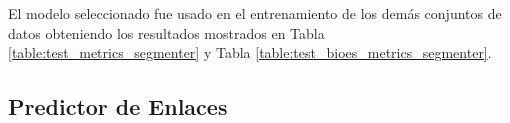 El modelo seleccionado fue usado en el entrenamiento de los demás conjuntos de datos obteniendo los resultados mostrados
en Tabla \ref{table:test_metrics_segmenter} y Tabla \ref{table:test_bioes_metrics_segmenter}.

\begin{table}[h!]
	\begin{center}
	\caption{Métricas de las pruebas del segmentador de UDA.}\label{table:test_metrics_segmenter}
	\end{center}
\end{table}
\begin{table}[h!]
	\begin{center}
	\caption{Métricas BIOES de las pruebas del segmentador de UDA.}\label{table:test_bioes_metrics_segmenter}
	\end{center}
\end{table}

\subsection{Predictor de Enlaces}

